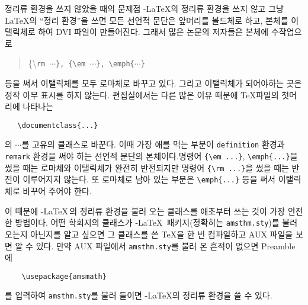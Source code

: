 \documentclass[a4paper,10pt]{amsproc}
\makeatletter
\let\gt\sffamily
\newcommand\amsthmstyle{\texttt{amsthm.sty}}
\newcommand\env[1]{\texttt{#1}}
\def\section{\@startsection{section}{1}%
  \z@{1.5\linespacing\@plus\linespacing}{1.2\linespacing}%
  {\large\sffamily\scshape\centering}}           %
\makeatother
\begin{document}
\section{정리류 환경을 쓰지 않았을 때의 문제점}
\AmS-\LaTeX 의 정리류 환경을 쓰지 않고 그냥 \LaTeX 의 ``정리 환경''을
쓰면 모든 선언적 문단은 앞머리를 볼드체로 하고, 본체를 이탤릭체로 하여
DVI 파일이 만들어진다. 그래서 많은 논문의 저자들은 본체에 수작업으로
\begin{quote}
  \{\textbackslash \texttt{rm\; $\cdots$\}, \quad \{\textbackslash em\;
    $\cdots$\}, \quad \textbackslash emph\{\;$\cdots$\}}
\end{quote}
등을 써서 이탤릭체를 모두 로마체로 바꾸고 있다. 그리고 이탤릭체가
되어야하는 곳은 정작 아무 표시를 하지 않는다. 편집실에서는 다른 많은
이유 때문에 \TeX 파일의 첫머리에 나타나는
\begin{verbatim}
   \documentclass{...}
\end{verbatim}
의 $\cdots$를 고유의 클래스로 바꾼다. 이때 가장 애를 먹는 부분이
\env{definition} 환경과 \env{remark} 환경을 써야 하는 선언적
문단의 본체이다.명령어 
\verb|{\em ...}|, \verb|\emph{...}|을 썼을 때는 로마체와 이탤릭체가
완전히 반전되지만 명령어 
\verb|{\rm ...}|을 썼을
때는 반전이 이루어지지 않는다. 또 로마체로 남아 있는 부분은
\verb|\emph{...}|
등을 써서 이탤릭체로 바꾸어 주어야 한다.

이 때문에 {\AmS}-{\LaTeX}\,의 정리류 환경을 불러 오는 클래스를 애초부터
쓰는 것이 가장 안전한 방법이다. 어떤 학회지의 클래스가
{\AmS}-{\LaTeX}\, 패키지(정확히는 \amsthmstyle )를 불러 오는지 아닌지를
알고 싶으면 그 클래스를 쓴 \TeX 을 한 번 컴파일하고 AUX 파일을 보면 알
수 있다. 만약 AUX 파일에서 \amsthmstyle 를 불러 온 흔적이 없으면
Preamble 에
\begin{verbatim}
    \usepackage{amsmath}
\end{verbatim}
를 입력하여 \amsthmstyle 를 불러 들이면 {\AmS}-{\LaTeX}의 정리류 환경을
쓸 수 있다.
\end{document}
